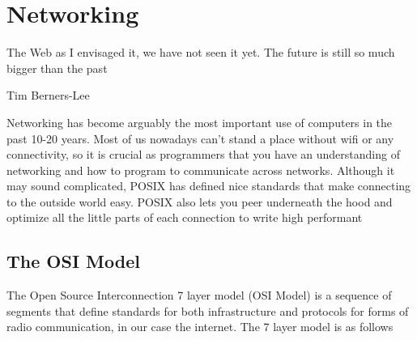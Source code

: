 \chapter{Networking}

\epigraph{The Web as I envisaged it, we have not seen it yet. The future is still so much bigger than the past}{Tim Berners-Lee}

Networking has become arguably the most important use of computers in the past 10-20 years. Most of us nowadays can't stand a place without wifi or any connectivity, so it is crucial as programmers that you have an understanding of networking and how to program to communicate across networks. Although it may sound complicated, POSIX has defined nice standards that make connecting to the outside world easy. POSIX also lets you peer underneath the hood and optimize all the little parts of each connection to write high performant

\section{The OSI Model}

The Open Source Interconnection 7 layer model (OSI Model) is a sequence of segments that define standards for both infrastructure and protocols for forms of radio communication, in our case the internet. The 7 layer model is as follows

